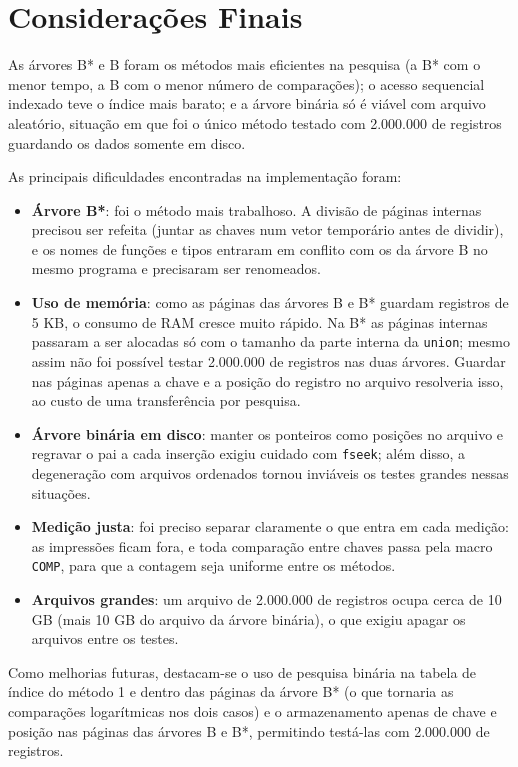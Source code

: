 \documentclass{article}
\begin{document}
\clearpage
\section{Considerações Finais}

As árvores B* e B foram os métodos mais eficientes na pesquisa (a B* com o menor tempo, a B com o menor número de comparações); o acesso sequencial indexado teve o índice mais barato; e a árvore binária só é viável com arquivo aleatório, situação em que foi o único método testado com 2.000.000 de registros guardando os dados somente em disco.

As principais dificuldades encontradas na implementação foram:

\begin{itemize}
    \item \textbf{Árvore B*}: foi o método mais trabalhoso. A divisão de páginas internas precisou ser refeita (juntar as chaves num vetor temporário antes de dividir), e os nomes de funções e tipos entraram em conflito com os da árvore B no mesmo programa e precisaram ser renomeados.
    \item \textbf{Uso de memória}: como as páginas das árvores B e B* guardam registros de 5 KB, o consumo de RAM cresce muito rápido. Na B* as páginas internas passaram a ser alocadas só com o tamanho da parte interna da \texttt{union}; mesmo assim não foi possível testar 2.000.000 de registros nas duas árvores. Guardar nas páginas apenas a chave e a posição do registro no arquivo resolveria isso, ao custo de uma transferência por pesquisa.
    \item \textbf{Árvore binária em disco}: manter os ponteiros como posições no arquivo e regravar o pai a cada inserção exigiu cuidado com \texttt{fseek}; além disso, a degeneração com arquivos ordenados tornou inviáveis os testes grandes nessas situações.
    \item \textbf{Medição justa}: foi preciso separar claramente o que entra em cada medição: as impressões ficam fora, e toda comparação entre chaves passa pela macro \texttt{COMP}, para que a contagem seja uniforme entre os métodos.
    \item \textbf{Arquivos grandes}: um arquivo de 2.000.000 de registros ocupa cerca de 10 GB (mais 10 GB do arquivo da árvore binária), o que exigiu apagar os arquivos entre os testes.
\end{itemize}

Como melhorias futuras, destacam-se o uso de pesquisa binária na tabela de índice do método 1 e dentro das páginas da árvore B* (o que tornaria as comparações logarítmicas nos dois casos) e o armazenamento apenas de chave e posição nas páginas das árvores B e B*, permitindo testá-las com 2.000.000 de registros.

\clearpage


\end{document}
